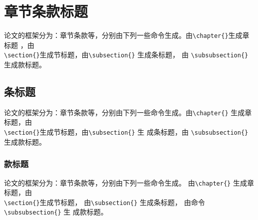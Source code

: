 \section{章节条款标题}\label{section1-3}
论文的框架分为：章节条款等，分别由下列一些命令生成。由\verb|\chapter{}|生成章标题
，由 \\ \verb|\section{}|生成节标题，由\verb|\subsection{}| 生成条标题，
   由 \verb|\subsubsection{}| 生成款标题。

\subsection{条标题}\label{section1-3-1}
论文的框架分为：章节条款等，分别由下列一些命令生成。由\verb|\chapter{}|
生成章标题，由 \\ \verb|\section{}|生成节标题，由\verb|\subsection{}| 生
成条标题，由 \verb|\subsubsection{}| 生成款标题。

\subsubsection{款标题}\label{section1-3-1-1}
论文的框架分为：章节条款等，分别由下列一些命令生成。
由\verb|\chapter{}| 生成章标题，由\\ \verb|\section{}|生成节标题，
由\verb|\subsection{}| 生成条标题， 由命令\verb|\subsubsection{}| 生
成款标题。


